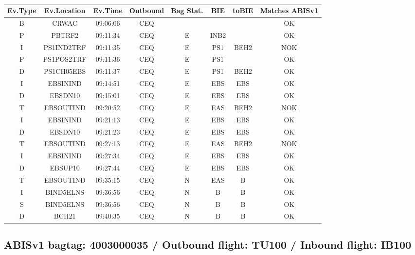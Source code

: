 \documentclass{report}
\begin{document}
\paragraph{}
\begin{longtable}{cccccccc}    \toprule
\rowcolor{white!50}
\textbf{Ev.Type} & \textbf{Ev.Location} & \textbf{Ev.Time} & \textbf{Outbound} & \textbf{Bag Stat.} & \textbf{BIE} & \textbf{toBIE} & \textbf{Matches ABISv1} \\\midrule
B & CRWAC & 09:06:06  & CEQ &  &  &  & OK\\
P & PBTRF2 & 09:11:34  & CEQ & E & INB2 &  & OK\\
I & PS1IND2TRF & 09:11:35  & CEQ & E & PS1 & BEH2 & NOK\\
P & PS1POS2TRF & 09:11:36  & CEQ & E & PS1 &  & OK\\
D & PS1CH05EBS & 09:11:37  & CEQ & E & PS1 & BEH2 & OK\\
I & EBSININD & 09:14:51  & CEQ & E & EBS & EBS & OK\\
D & EBSDN10 & 09:15:01  & CEQ & E & EBS & EBS & OK\\
T & EBSOUTIND & 09:20:52  & CEQ & E & EAS & BEH2 & NOK\\
I & EBSININD & 09:21:13  & CEQ & E & EBS & EBS & OK\\
D & EBSDN10 & 09:21:23  & CEQ & E & EBS & EBS & OK\\
T & EBSOUTIND & 09:27:13  & CEQ & E & EAS & BEH2 & NOK\\
I & EBSININD & 09:27:34  & CEQ & E & EBS & EBS & OK\\
D & EBSUP10 & 09:27:44  & CEQ & E & EBS & EBS & OK\\
T & EBSOUTIND & 09:35:15  & CEQ & N & EAS & B & OK\\
I & BIND5ELNS & 09:36:56  & CEQ & N & B & B & OK\\
S & BIND5ELNS & 09:36:56  & CEQ & N & B & B & OK\\
D & BCH21 & 09:40:35  & CEQ & N & B & B & OK\\
\bottomrule
\end{longtable}
\subsection*{ABISv1 bagtag: 4003000035 / Outbound flight: TU100 / Inbound flight: IB100}
\end{document}
